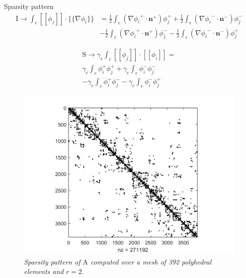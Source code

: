 \documentclass{beamer}
\begin{document}
\begin{frame}{Sparsity pattern}
	\vspace*{-12pt}
	\begin{align*}
	\mathrm{I} \rightarrow \int_e [\![\phi_j]\!] \cdot \{\!\!\{ \nabla \phi_i 
	\}\!\!\} &=
	\frac{1}{2} \int_e (\nabla{\phi_i}^+ \cdot \mathbf{n}^+ )\phi_j^+
	+ \frac{1}{2} \int_e (\nabla{\phi_i}^- \cdot \mathbf{n}^- )\phi_j^-\\
	&- \frac{1}{2} \int_e (\nabla{\phi_i}^+ \cdot \mathbf{n}^+ )\phi_j^-
	- \frac{1}{2} \int_e (\nabla{\phi_i}^- \cdot \mathbf{n}^- )\phi_j^+
	\end{align*}
	\vspace*{-1cm}
	\begin{minipage}[t]{0.55\textwidth}
		\begin{multline*}
			\mathrm{S} \rightarrow \gamma_e \int_e [\![\phi_j]\!] \cdot 
			[\![\phi_i]\!] =\\
			\gamma_e \int_e \phi_i^+ \phi_j^+
			+ \gamma_e \int_e \phi_i^- \phi_j^-\\
			- \gamma_e \int_e \phi_i^+ \phi_j^-
			- \gamma_e \int_e \phi_i^- \phi_j^+
		\end{multline*}
	\end{minipage}%
	\begin{minipage}[t]{0.45\textwidth}
	\begin{figure}
		\centering
		\includegraphics[scale=0.35]{spy_A}\\
		\tiny
		\textit{Sparsity pattern of $\mathrm{A}$ computed over a mesh 
		of 392 polyhedral elements and $r=2$}.
	\end{figure}
\end{minipage}
\end{frame}
\end{document}
